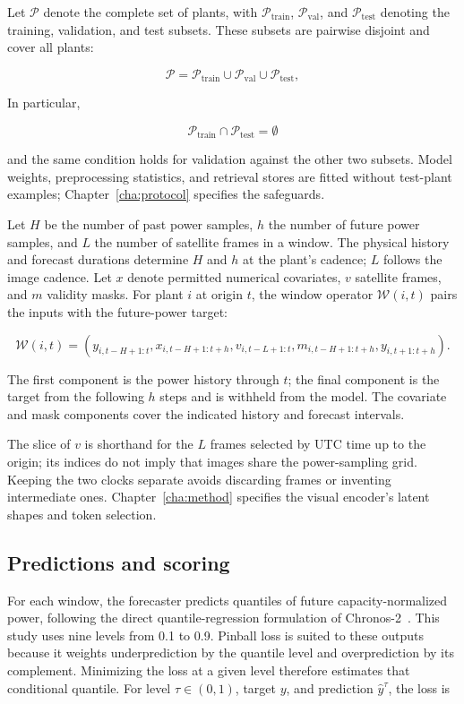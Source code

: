 Let $\mathcal{P}$ denote the complete set of plants, with $\mathcal{P}_{\mathrm{train}}$, $\mathcal{P}_{\mathrm{val}}$, and $\mathcal{P}_{\mathrm{test}}$ denoting the training, validation, and test subsets. These subsets are pairwise disjoint and cover all plants:

\[
\mathcal{P} = \mathcal{P}_{\mathrm{train}} \cup \mathcal{P}_{\mathrm{val}} \cup \mathcal{P}_{\mathrm{test}},
\]

In particular,

\[
\mathcal{P}_{\mathrm{train}} \cap \mathcal{P}_{\mathrm{test}} = \emptyset
\]

and the same condition holds for validation against the other two subsets. Model weights, preprocessing statistics, and retrieval stores are fitted without test-plant examples; Chapter~\ref{cha:protocol} specifies the safeguards.

Let $H$ be the number of past power samples, $h$ the number of future power samples, and $L$ the number of satellite frames in a window. The physical history and forecast durations determine $H$ and $h$ at the plant's cadence; $L$ follows the image cadence. Let $x$ denote permitted numerical covariates, $v$ satellite frames, and $m$ validity masks. For plant $i$ at origin $t$, the window operator $\mathcal{W}(i,t)$ pairs the inputs with the future-power target:

\[
\mathcal{W}(i,t) = \left(y_{i,t-H+1:t}, x_{i,t-H+1:t+h}, v_{i,t-L+1:t}, m_{i,t-H+1:t+h}, y_{i,t+1:t+h}\right).
\]

The first component is the power history through $t$; the final component is the target from the following $h$ steps and is withheld from the model. The covariate and mask components cover the indicated history and forecast intervals.

The slice of $v$ is shorthand for the $L$ frames selected by UTC time up to the origin; its indices do not imply that images share the power-sampling grid. Keeping the two clocks separate avoids discarding frames or inventing intermediate ones. Chapter~\ref{cha:method} specifies the visual encoder's latent shapes and token selection.

\subsection{Predictions and scoring}
\label{sec:metric-definitions}

For each window, the forecaster predicts quantiles of future capacity-normalized power, following the direct quantile-regression formulation of Chronos-2~\cite{chronos2}. This study uses nine levels from 0.1 to 0.9. Pinball loss is suited to these outputs because it weights underprediction by the quantile level and overprediction by its complement. Minimizing the loss at a given level therefore estimates that conditional quantile. For level $\tau\in(0,1)$, target $y$, and prediction $\hat{y}^{\tau}$, the loss is


